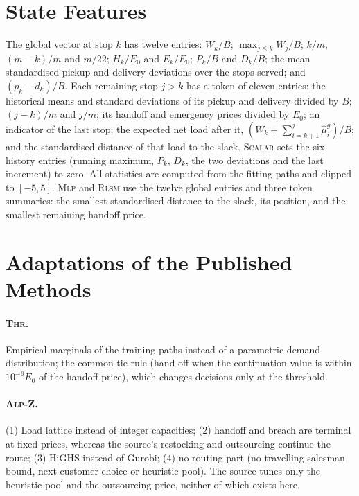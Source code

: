 \documentclass[trsc,dblanonrev]{informs4}
\newcommand{\Scalar}{\textsc{Scalar}}
\newcommand{\Mlp}{\textsc{Mlp}}
\newcommand{\Thr}{\textsc{Thr}}
\newcommand{\Alpz}{\textsc{Alp-Z}}
\newcommand{\Rlsm}{\textsc{Rlsm}}
\begin{document}




\begin{APPENDICES}

\section{State Features}\label{app:features}

The global vector at stop $k$ has twelve entries: $W_k/B$; $\max_{j \le k}
W_j/B$; $k/m$, $(m-k)/m$ and $m/22$; $H_k/E_0$ and $E_k/E_0$; $P_k/B$ and
$D_k/B$; the mean standardised pickup and delivery deviations over the stops
served; and $(p_k - d_k)/B$. Each remaining stop $j > k$ has a token of eleven
entries: the historical means and standard deviations of its pickup and
delivery divided by $B$; $(j-k)/m$ and $j/m$; its handoff and emergency prices
divided by $E_0$; an indicator of the last stop; the expected net load after
it, $(W_k + \sum_{i=k+1}^{j}\hat\mu^g_i)/B$; and the standardised distance of
that load to the slack. \Scalar{} sets the six history entries (running
maximum, $P_k$, $D_k$, the two deviations and the last increment) to zero.
All statistics are computed from the fitting paths and clipped to $[-5, 5]$.
\Mlp{} and \Rlsm{} use the twelve global entries and three token summaries: the
smallest standardised distance to the slack, its position, and the smallest
remaining handoff price.

\section{Adaptations of the Published Methods}\label{app:adapt}

\paragraph{\Thr{}.} Empirical marginals of the training paths instead of a
parametric demand distribution; the common tie rule (hand off when the
continuation value is within $10^{-6}E_0$ of the handoff price), which changes
decisions only at the threshold.

\paragraph{\Alpz{}.} (1) Load lattice instead of integer capacities; (2)
handoff and breach are terminal at fixed prices, whereas the source's
restocking and outsourcing continue the route; (3) HiGHS instead of Gurobi;
(4) no routing part (no travelling-salesman bound, next-customer choice or
heuristic pool). The source tunes only the heuristic pool and the outsourcing
price, neither of which exists here.


\end{APPENDICES}
\end{document}

